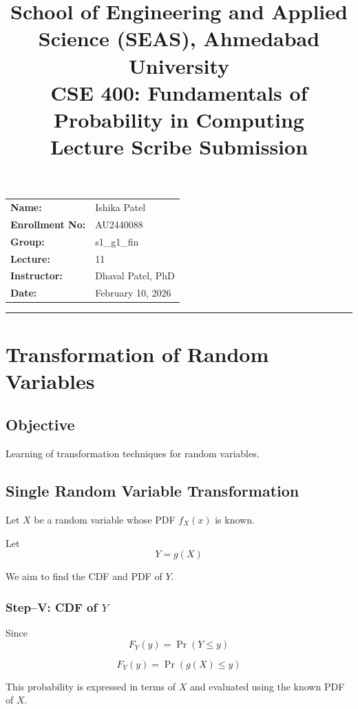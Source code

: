 \documentclass[11pt]{article}
\title{
    \normalsize School of Engineering and Applied Science (SEAS), Ahmedabad University \\
    \vspace{0.2cm}
    \textbf{CSE 400: Fundamentals of Probability in Computing}\\
    \Large Lecture Scribe Submission
}
\author{}
\date{}
\begin{document}
\maketitle

\vspace{-2cm}
\begin{center}
    \begin{tabular}{ll}
        \textbf{Name:} & Ishika Patel \\[1.5ex]
        \textbf{Enrollment No:} & AU2440088 \\[1.5ex]
        \textbf{Group:} & s1\_g1\_fin \\[1.5ex]
        \textbf{Lecture:} & 11 \\[1.5ex]
        \textbf{Instructor:} & Dhaval Patel, PhD \\[1.5ex]
        \textbf{Date:} & February 10, 2026
    \end{tabular}
\end{center}

\hrule
\vspace{0.5cm}

\section{Transformation of Random Variables}

\subsection{Objective}

Learning of transformation techniques for random variables.

\subsection{Single Random Variable Transformation}

Let $X$ be a random variable whose PDF $f_X(x)$ is known.

Let
\[
Y = g(X)
\]

We aim to find the CDF and PDF of $Y$.

\subsubsection*{Step–V: CDF of $Y$}

Since
\[
F_Y(y) = \Pr(Y \le y)
\]

\[
F_Y(y) = \Pr(g(X) \le y)
\]

This probability is expressed in terms of $X$ and evaluated using the known PDF of $X$.
\end{document}
